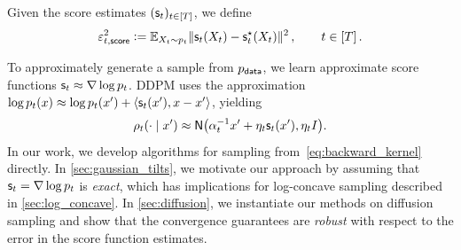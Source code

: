 \begin{definition}\label{def:score-error}
Given the score estimates $(\scf_t)_{t\in [T]}$, we define
\begin{align}\notag
    \epssct[t]^2\ldef \En_{X_t\sim p_t}\nrm{\scf_t(X_t)-\scfs_t(X_t)}^2\,, \qquad t\in[T]\,.
\end{align}
\end{definition}

To approximately generate a sample from $\pdata$, we learn approximate score functions $\scf_t\approx \nabla \log p_t$.
DDPM uses the approximation $\log p_t(x) \approx \log p_t(x') + \langle \scf_t(x'), x-x'\rangle$, yielding
\begin{align}\label{eq:DDPM-approx}
    \rho_t(\cdot\mid x') \approx \normal{\alpha_t^{-1} x' + \eta_t \scf_t(x'), \eta_t I}.
\end{align}
In our work, we develop algorithms for sampling from~\eqref{eq:backward_kernel} directly. In \cref{sec:gaussian_tilts}, we motivate our approach by assuming that $\scf_t=\nabla \log p_t$ is \emph{exact}, which has implications for log-concave sampling described in \cref{sec:log_concave}. In \cref{sec:diffusion}, we instantiate our methods on diffusion sampling and show that the convergence guarantees are \emph{robust} with respect to the error in the score function estimates.


